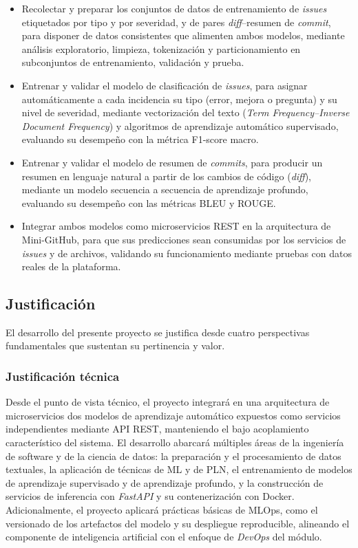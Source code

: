     \begin{itemize}
        \item Recolectar y preparar los conjuntos de datos de entrenamiento de \textit{issues} etiquetados por tipo y por severidad, y de pares \textit{diff}--resumen de \textit{commit}, para disponer de datos consistentes que alimenten ambos modelos, mediante análisis exploratorio, limpieza, tokenización y particionamiento en subconjuntos de entrenamiento, validación y prueba.

        \item Entrenar y validar el modelo de clasificación de \textit{issues}, para asignar automáticamente a cada incidencia su tipo (error, mejora o pregunta) y su nivel de severidad, mediante vectorización del texto (\textit{Term Frequency--Inverse Document Frequency}) y algoritmos de aprendizaje automático supervisado, evaluando su desempeño con la métrica F1-score macro.

        \item Entrenar y validar el modelo de resumen de \textit{commits}, para producir un resumen en lenguaje natural a partir de los cambios de código (\textit{diff}), mediante un modelo secuencia a secuencia de aprendizaje profundo, evaluando su desempeño con las métricas BLEU y ROUGE.

        \item Integrar ambos modelos como microservicios \acrshort{REST} en la arquitectura de Mini-GitHub, para que sus predicciones sean consumidas por los servicios de \textit{issues} y de archivos, validando su funcionamiento mediante pruebas con datos reales de la plataforma.
    \end{itemize}


\subsection{Justificación}

El desarrollo del presente proyecto se justifica desde cuatro perspectivas fundamentales que sustentan su pertinencia y valor.

\subsubsection{Justificación técnica}

Desde el punto de vista técnico, el proyecto integrará en una arquitectura de microservicios dos modelos de aprendizaje automático expuestos como servicios independientes mediante \acrshort{API} \acrshort{REST}, manteniendo el bajo acoplamiento característico del sistema. El desarrollo abarcará múltiples áreas de la ingeniería de software y de la ciencia de datos: la preparación y el procesamiento de datos textuales, la aplicación de técnicas de \acrshort{ML} y de \acrfull{PLN}, el entrenamiento de modelos de aprendizaje supervisado y de aprendizaje profundo, y la construcción de servicios de inferencia con \textit{FastAPI} y su contenerización con Docker. Adicionalmente, el proyecto aplicará prácticas básicas de \acrfull{MLOps}, como el versionado de los artefactos del modelo y su despliegue reproducible, alineando el componente de inteligencia artificial con el enfoque de \textit{DevOps} del módulo.

